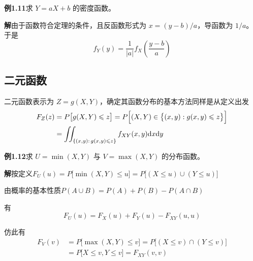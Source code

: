 \documentclass[11pt,openany,UTF8]{ctexbook}
\newcommand{\dif}{\mathrm{d}}                      %
\begin{document}
\begin{examplebox}
\textbf{例1.11}\quad 求 $Y=aX+b$ 的密度函数\nobreak。

\textbf{解}\quad 由于函数符合定理的条件\nobreak，且反函数形式为 $x=(y-b)/a$\nobreak，导函数为 $1/a$\nobreak。于是
\begin{equation}
f_Y(y)=\frac{1}{\lvert a\rvert}f_X\left(\frac{y-b}{a}\right)
\label{eq:1.29}
\end{equation}
\end{examplebox}

\subsection{二元函数}

二元函数表示为 $Z=g(X,Y)$\nobreak，确定其函数分布的基本方法同样是从定义出发
\begin{equation}
\begin{aligned}
F_Z(z)&=P\bigl[g(X,Y)\leqslant z\bigr]=P\Bigl[(X,Y)\in\bigl\{(x,y):g(x,y)\leqslant z\bigr\}\Bigr]\\
&=\iint_{\{(x,y):\,g(x,y)\leqslant z\}}f_{XY}(x,y)\dif x\dif y
\end{aligned}
\label{eq:1.30}
\end{equation}

\begin{examplebox}
\textbf{例1.12}\quad 求 $U=\min(X,Y)$ 与 $V=\max(X,Y)$ 的分布函数\nobreak。

\textbf{解}\quad 按定义\qquad $F_U(u)=P\bigl[\min(X,Y)\leqslant u\bigr]=P\bigl[(X\leqslant u)\cup(Y\leqslant u)\bigr]$

由概率的基本性质\qquad $P(A\cup B)=P(A)+P(B)-P(A\cap B)$

有
\begin{equation}
F_U(u)=F_X(u)+F_Y(u)-F_{XY}(u,u)
\label{eq:1.31}
\end{equation}

仿此有
\begin{equation}
\begin{aligned}
F_V(v)&=P\bigl[\max(X,Y)\leqslant v\bigr]=P\bigl[(X\leqslant v)\cap(Y\leqslant v)\bigr]\\
&=P\bigl[X\leqslant v,Y\leqslant v\bigr]=F_{XY}(v,v)
\end{aligned}
\label{eq:1.32}
\end{equation}
\end{examplebox}
\end{document}
